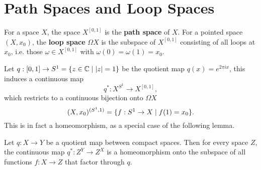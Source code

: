 \section{Path Spaces and Loop Spaces}

For a space $X$, the space $X^{[0,1]}$ is the \textbf{path space} of $X$. For a pointed space $(X,x_0)$, the \textbf{loop space} $\Omega X$ is the subspace of $X^{[0,1]}$ consisting of all loops at $x_0$, i.e. those $\omega\in X^{[0,1]}$ with $\omega(0)=\omega(1)=x_0$.

Let $q:[0,1]\to S^1=\{z\in\mathbb{C}\mid|z|=1\}$ be the quotient map $q(x)=e^{2\pi ix}$, this induces a continuous map
\[q^*:X^{S^1}\to X^{[0,1]},\]
which restricts to a continuous bijection onto $\Omega X$
\[(X,x_0)^{(S^1,1)}=\{f:S^1\to X\mid f(1)=x_0\}.\]
This is in fact a homeomorphism, as a special case of the following lemma.

\begin{lemma**}
Let $q:X\to Y$ be a quotient map between compact spaces. Then for every space $Z$, the continuous map $q^*:Z^Y\to Z^X$ is a homeomorphism onto the subspace of all functions $f:X\to Z$ that factor through $q$.
\end{lemma**}
